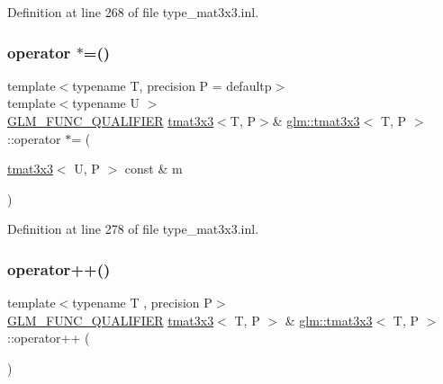 Definition at line 268 of file type\+\_\+mat3x3.\+inl.

\mbox{\label{structglm_1_1tmat3x3_aa4636bb97bac71a3b76c9afadb364f47}} 
\subsubsection{\texorpdfstring{operator $\ast$=()}{operator *=()}\hspace{0.1cm}{\footnotesize\ttfamily [4/4]}}
{\footnotesize\ttfamily template$<$typename T, precision P = defaultp$>$ \\
template$<$typename U $>$ \\
\mbox{\hyperlink{setup_8hpp_a33fdea6f91c5f834105f7415e2a64407}{G\+L\+M\+\_\+\+F\+U\+N\+C\+\_\+\+Q\+U\+A\+L\+I\+F\+I\+ER}} \mbox{\hyperlink{structglm_1_1tmat3x3}{tmat3x3}}$<$T, P$>$\& \mbox{\hyperlink{structglm_1_1tmat3x3}{glm\+::tmat3x3}}$<$ T, P $>$\+::operator $\ast$= (\begin{DoxyParamCaption}\item[{\mbox{\hyperlink{structglm_1_1tmat3x3}{tmat3x3}}$<$ U, P $>$ const \&}]{m }\end{DoxyParamCaption})}



Definition at line 278 of file type\+\_\+mat3x3.\+inl.

\mbox{\label{structglm_1_1tmat3x3_abf574c05769a6e30060fceee846cc823}} 
\subsubsection{\texorpdfstring{operator++()}{operator++()}\hspace{0.1cm}{\footnotesize\ttfamily [1/2]}}
{\footnotesize\ttfamily template$<$typename T , precision P$>$ \\
\mbox{\hyperlink{setup_8hpp_a33fdea6f91c5f834105f7415e2a64407}{G\+L\+M\+\_\+\+F\+U\+N\+C\+\_\+\+Q\+U\+A\+L\+I\+F\+I\+ER}} \mbox{\hyperlink{structglm_1_1tmat3x3}{tmat3x3}}$<$ T, P $>$ \& \mbox{\hyperlink{structglm_1_1tmat3x3}{glm\+::tmat3x3}}$<$ T, P $>$\+::operator++ (\begin{DoxyParamCaption}{ }\end{DoxyParamCaption})}



